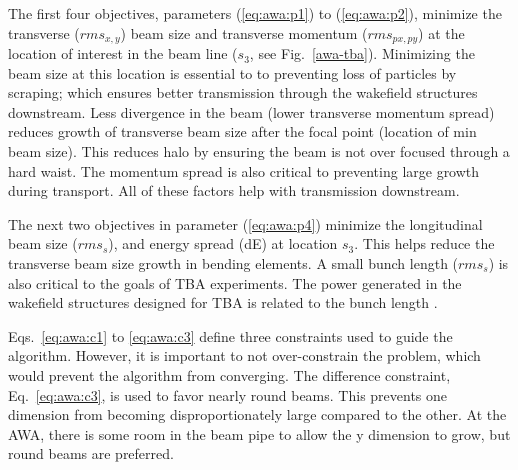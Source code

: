 The first four objectives, parameters (\ref{eq:awa:p1}) to (\ref{eq:awa:p2}),
minimize the transverse ($rms_{x,y}$) beam size and transverse momentum ($rms_{px,py}$)
at the location of interest in the beam line ($s_3$, see Fig.~\ref{awa-tba}). 
Minimizing the beam size at this location is essential to 
to preventing loss of particles by scraping; 
which ensures better transmission through the wakefield structures downstream. 
Less divergence in the beam (lower transverse momentum spread) 
reduces growth of transverse beam size after the focal point (location of min beam size).
This reduces halo by ensuring the beam is not over focused through a hard waist.
The momentum spread is also critical to preventing large growth during transport. 
All of these factors help with transmission downstream. 

The next two objectives in parameter (\ref{eq:awa:p4}) minimize the 
longitudinal beam size ($rms_s$), and energy spread (dE) at location $s_3$. 
This helps reduce the transverse beam size growth in bending elements.
A small bunch length ($rms_s$) is also critical to the goals of 
TBA experiments. The power generated in the wakefield structures 
designed for TBA is related to the bunch length \cite{JING201872,PETSeq}.

Eqs.~\ref{eq:awa:c1} to \ref{eq:awa:c3} 
define three constraints used to guide the algorithm.
However, it is important to not over-constrain the problem, which would prevent
the algorithm from converging.
The difference constraint, Eq.~\ref{eq:awa:c3}, is used to favor nearly round beams.
This prevents one dimension from becoming disproportionately large compared to the other.
At the AWA, there is some room in the beam pipe to allow the y dimension to grow, but round beams are preferred.

